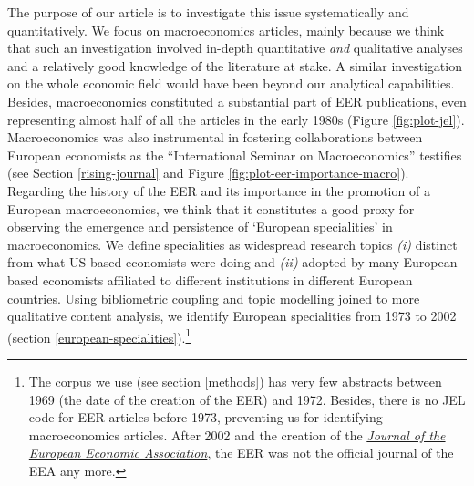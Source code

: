 \documentclass[]{elsarticle} %
\begin{document}
The purpose of our article is to investigate this issue systematically
and quantitatively. We focus on macroeconomics articles, mainly because
we think that such an investigation involved in-depth quantitative
\emph{and} qualitative analyses and a relatively good knowledge of the
literature at stake. A similar investigation on the whole economic field
would have been beyond our analytical capabilities. Besides,
macroeconomics constituted a substantial part of EER publications, even
representing almost half of all the articles in the early 1980s (Figure
\ref{fig:plot-jel}). Macroeconomics was also instrumental in fostering
collaborations between European economists as the ``International
Seminar on Macroeconomics'' testifies (see Section \ref{rising-journal}
and Figure \ref{fig:plot-eer-importance-macro}). Regarding the history
of the EER and its importance in the promotion of a European
macroeconomics, we think that it constitutes a good proxy for observing
the emergence and persistence of `European specialities' in
macroeconomics. We define specialities as widespread research topics
\emph{(i)} distinct from what US-based economists were doing and
\emph{(ii)} adopted by many European-based economists affiliated to
different institutions in different European countries. Using
bibliometric coupling and topic modelling joined to more qualitative
content analysis, we identify European specialities from 1973 to 2002
(section \ref{european-specialities}).\footnote{The corpus we use (see
  section \ref{methods}) has very few abstracts between 1969 (the date
  of the creation of the EER) and 1972. Besides, there is no JEL code
  for EER articles before 1973, preventing us for identifying
  macroeconomics articles. After 2002 and the creation of the
  \href{https://academic.oup.com/jeea}{\emph{Journal of the European
  Economic Association}}, the EER was not the official journal of the
  EEA any more.}
\end{document}
